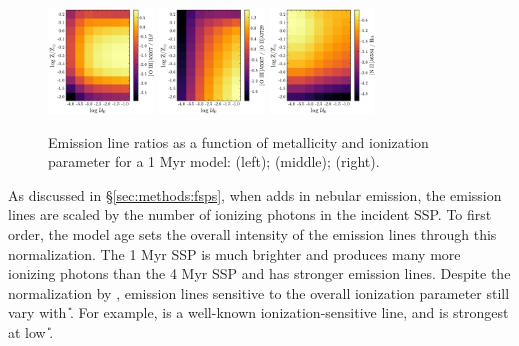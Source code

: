 \begin{figure}[!htbp]
  \begin{centering}
    \includegraphics[width=0.25\textwidth]{manuscript/chapter2/f15a.pdf}
    \includegraphics[width=0.25\textwidth]{manuscript/chapter2/f15b.pdf}
    \includegraphics[width=0.25\textwidth]{manuscript/chapter2/f15c.pdf}
    \caption{Emission line ratios as a function of metallicity and ionization parameter for a 1 Myr model: \oiiihb{} (left); \oiiioii{} (middle); \niiha{} (right).}
    \label{fig:LineRatios}
  \end{centering}
\end{figure}

As discussed in \S\ref{sec:methods:fsps}, when \FSPS adds in nebular emission, the emission lines are scaled by the number of ionizing photons in the incident SSP. To first order, the model age sets the overall intensity of the emission lines through this \QH{} normalization. The 1 Myr SSP is much brighter and produces many more ionizing photons than the 4 Myr SSP and has stronger emission lines. Despite the normalization by \QH{}, emission lines sensitive to the overall ionization parameter still vary with \U{}. For example, \sii{} is a well-known ionization-sensitive line, and is strongest at low \U{}.

